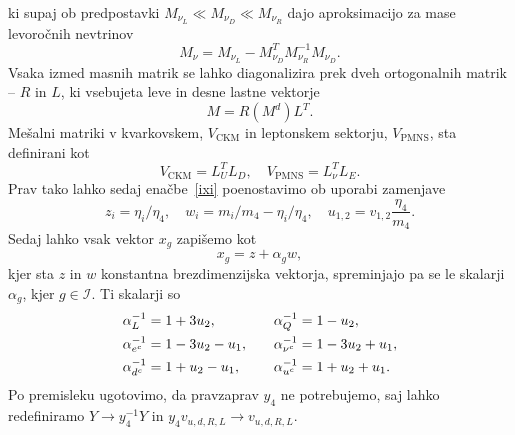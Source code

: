 ki supaj ob predpostavki $M_{\nu_L} \ll M_{\nu_D} \ll M_{\nu_R}$ dajo aproksimacijo za mase levoročnih
nevtrinov
\begin{equation}
	M_\nu = M_{\nu_L} - M^T_{\nu_D} M_{\nu_R}^{-1} M_{\nu_D}.
\end{equation}
Vsaka izmed masnih matrik se lahko diagonalizira prek dveh ortogonalnih matrik -- $R$ in $L$, ki
vsebujeta leve in desne lastne vektorje
\begin{equation}
	M = R (M^d) L^T.
	\label{diagSVD}
\end{equation}
Mešalni matriki v kvarkovskem, $V_\text{CKM}$ in leptonskem sektorju, $V_\text{PMNS}$, sta definirani
kot
\begin{equation}
	V_\text{CKM} = L_U^T L_D, \quad V_\text{PMNS} = L_\nu^T L_E.
	\label{defMIX}
\end{equation}
Prav tako lahko sedaj enačbe~\eqref{ixi} poenostavimo ob uporabi zamenjave
\begin{equation}
	z_i = \eta_i/\eta_4, \quad w_i = m_i/m_4 - \eta_i/\eta_4, \quad u_{1,2} = v_{1,2}\frac{\eta_4}{m_4}.
\end{equation}
Sedaj lahko vsak vektor $x_g$ zapišemo kot
\[
	x_g = z + \alpha_g w,
\]
kjer sta $z$ in $w$ konstantna brezdimenzijska vektorja, spreminjajo pa se le skalarji $\alpha_g$, kjer
$g \in \mathcal{I}$. Ti skalarji so
\begin{alignat}{3}
	\alpha_L^{-1} &= 1 + 3u_2, &\quad \alpha_Q^{-1} &= 1 - u_2, \notag \\
	\alpha^{-1}_{e^c} &= 1 - 3u_2 - u_1, &\quad \alpha_{\nu^c}^{-1} &= 1 - 3u_2 + u_1, \\
	\alpha^{-1}_{d^c} &= 1 + u_2 - u_1, &\quad \alpha^{-1}_{u^c} &= 1 + u_2 + u_1. \notag
\end{alignat}
Po premisleku ugotovimo, da pravzaprav $y_4$ ne potrebujemo, saj lahko redefiniramo
$Y \to y_4^{-1}Y$ in $y_4v_{u,d,R,L} \to v_{u,d,R,L}$.

